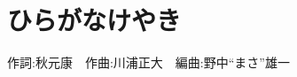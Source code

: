 \section{ひらがなけやき}

\begin{center}
    \scriptsize{
        作詞:秋元康　作曲:川浦正大　編曲:野中“まさ”雄一
    }
\end{center}

\vspace{0.7em}

\begin{Parallel}[c]{0.47\textwidth}{0.47\textwidth}

\ParallelLText{
    \footnotesize{
        
    }
}

\ParallelRText{
    \footnotesize{
        
    }
}

\end{Parallel}
